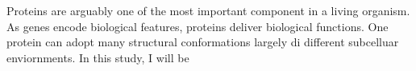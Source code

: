 Proteins are arguably one of the most important component in a living organism. As genes encode biological features, proteins deliver biological functions. One protein can adopt many structural conformations largely di different subcelluar enviornments.    In this study, I will be 